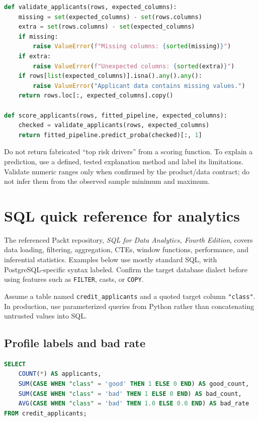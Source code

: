 \documentclass[10pt]{article}
\begin{document}
\begin{lstlisting}[language=Python,caption={Implementation: schema guard and probability scoring}]
def validate_applicants(rows, expected_columns):
    missing = set(expected_columns) - set(rows.columns)
    extra = set(rows.columns) - set(expected_columns)
    if missing:
        raise ValueError(f"Missing columns: {sorted(missing)}")
    if extra:
        raise ValueError(f"Unexpected columns: {sorted(extra)}")
    if rows[list(expected_columns)].isna().any().any():
        raise ValueError("Applicant data contains missing values.")
    return rows.loc[:, expected_columns].copy()

def score_applicants(rows, fitted_pipeline, expected_columns):
    checked = validate_applicants(rows, expected_columns)
    return fitted_pipeline.predict_proba(checked)[:, 1]
\end{lstlisting}

Do not return fabricated ``top risk drivers'' from a scoring function. To explain a prediction, use a defined, tested explanation method and label its limitations. Validate numeric ranges only when confirmed by the product/data contract; do not infer them from the observed sample minimum and maximum.

\section{SQL quick reference for analytics}
The referenced Packt repository, \emph{SQL for Data Analytics, Fourth Edition}, covers data loading, filtering, aggregation, CTEs, window functions, performance, and inferential statistics. Examples below use mostly standard SQL, with PostgreSQL-specific syntax labeled. Confirm the target database dialect before using features such as \texttt{FILTER}, casts, or \texttt{COPY}.

Assume a table named \texttt{credit\_applicants} and a quoted target column \texttt{"class"}. In production, use parameterized queries from Python rather than concatenating untrusted values into SQL.

\subsection{Profile labels and bad rate}
\begin{lstlisting}[language=SQL,caption={ANSI-style summary with conditional aggregation}]
SELECT
    COUNT(*) AS applicants,
    SUM(CASE WHEN "class" = 'good' THEN 1 ELSE 0 END) AS good_count,
    SUM(CASE WHEN "class" = 'bad' THEN 1 ELSE 0 END) AS bad_count,
    AVG(CASE WHEN "class" = 'bad' THEN 1.0 ELSE 0.0 END) AS bad_rate
FROM credit_applicants;
\end{lstlisting}
\end{document}
